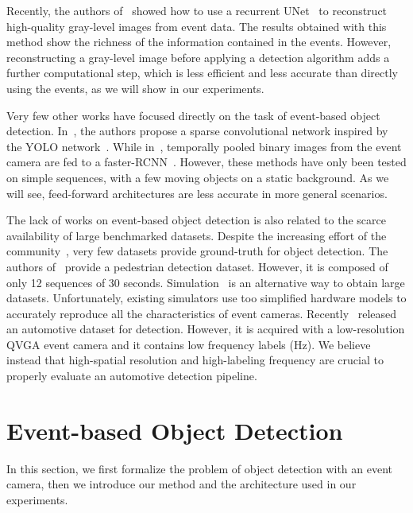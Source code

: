 \documentclass{article}
\begin{document}
Recently, the authors of~\cite{rebecq2019high} showed how to use a recurrent UNet~\cite{ronneberger2015u} to reconstruct high-quality gray-level images from event data. The results obtained with this method show the richness of the information contained in the events. 
However, reconstructing a gray-level image before applying a detection algorithm adds a further computational step, 
which is less efficient and less accurate than directly using the events, as we will show in our experiments.


Very few other works have focused directly on the task of event-based object detection. 
In~\cite{cannici2019asynchronous}, the authors propose a sparse convolutional network inspired by the YOLO network~\cite{redmon2016you}.
While in~\cite{li2017adaptive}, 
temporally pooled binary images from the event camera are fed to a faster-RCNN~\cite{ren2015faster}.
However, these methods have only been tested on simple sequences, with a few moving objects on
a static background. As we will see, feed-forward architectures are less accurate 
in more general scenarios. 


The lack of works on event-based object detection is also related to the scarce availability of large benchmarked datasets.
Despite the increasing effort of the community~\cite{orchard2015converting,amir2017low,binas2017ddd17,zhu2018multivehicle},
very few datasets provide ground-truth for object detection.
The authors of~\cite{miao2019neuromorphic} provide a pedestrian detection dataset. However, it is composed of only 12 sequences of 30 seconds.
Simulation~\cite{rebecq2018esim,gehrig2019video} is an alternative way to obtain large datasets.
Unfortunately, existing simulators use too simplified hardware models to accurately reproduce all the characteristics of event cameras.
Recently~\cite{de2020large} released an automotive 
dataset for detection. However, it is acquired with a low-resolution QVGA event camera 
and it contains low frequency labels (Hz). We believe instead that high-spatial resolution and
high-labeling frequency are crucial to properly evaluate an automotive detection pipeline. 





%
 
\section{Event-based Object Detection}
\label{sec:object_detection}
In this section, we first formalize the problem of object detection with an event camera,
then we introduce our method and the architecture used in our experiments.
\vspace{-2mm}
\end{document}
